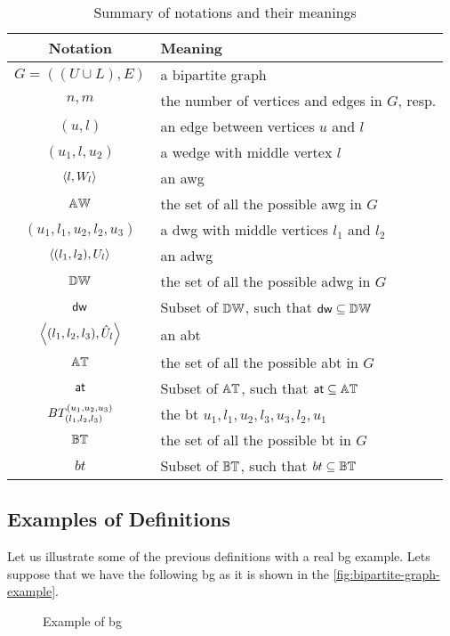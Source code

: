 \begin{table}[!ht]
\centering
\begin{tabular}{|c|l|} \hline
\textbf{Notation} & \textbf{Meaning}\\ \hline
$G=((U\cup L),E)$ & a bipartite graph\\  \hline
$n,m$ & the number of vertices and edges in $G$, resp.\\  \hline
$(u,l)$ & an edge between vertices $u$ and $l$\\  \hline
$(u_1,l,u_2)$ & a wedge with  middle vertex $l$\\  \hline
$\left\langle l, W_l \right\rangle$ & an \acrshort{awg}\\  \hline
$\mathbb{AW}$ & the set of all the possible \acrshort{awg} in $G$\\  \hline
$(u_1,l_1,u_2,l_2,u_3)$ & a \acrshort{dwg} with middle vertices $l_1$ and $l_2$\\  \hline 
$\left\langle (l_1, l_2), U_l \right\rangle$ & an \acrshort{adwg}\\  \hline
$\mathbb{DW}$ & the set of all the possible \acrshort{adwg} in $G$\\  \hline
$\mathsf{dw}$ & Subset of $\mathbb{DW}$, such that $\mathsf{dw} \subseteq \mathbb{DW}$ \\  \hline
$\left\langle (l_1, l_2,l_3), \hat{U}_l \right\rangle$ & an \acrshort{abt}\\  \hline
$\mathbb{AT}$ & the set of all the possible \acrshort{abt} in $G$ \\  \hline
$\mathsf{at}$ & Subset of $\mathbb{AT}$, such that $\mathsf{at} \subseteq \mathbb{AT}$ \\  \hline 
$BT_{(l_1, l_2,l_3)}^{(u_1, u_2, u_3)}$ & the \acrshort{bt} $u_1,l_1,u_2,l_3,u_3,l_2,u_1$\\  \hline
$\mathbb{BT}$ & the set of all the possible \acrshort{bt} in $G$ \\  \hline
$bt$ & Subset of $\mathbb{BT}$, such that $bt \subseteq \mathbb{BT}$ \\  \hline
\end{tabular}
\caption{Summary of notations and their meanings}
\label{table:notation}
\end{table}
      

\subsection{Examples of Definitions}
Let us illustrate some of the previous definitions with a real \acrlong{bg} example. 
Lets suppose that we have the following \acrshort{bg} as it is shown in the \autoref{fig:bipartite-graph-example}.

\begin{figure}[ht]
\centering	
{}
\caption[Example of \acrshort{bg}]{Example of \acrshort{bg}}
\label{fig:bipartite-graph-example}
\end{figure}

